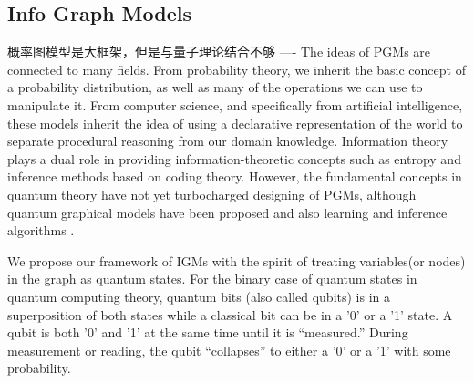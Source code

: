 \documentclass{article}
\theoremstyle{definition}
\theoremstyle{remark}
\theoremstyle{definition}
\begin{document}
\begin{CJK*}{UTF8}{gbsn}

\section{Info Graph Models}

概率图模型是大框架，但是与量子理论结合不够 ----
The ideas of PGMs are connected to many fields. From probability theory, we inherit the basic concept of a probability distribution, as well as many of the operations we can use to manipulate it. From computer science, and specifically from artificial intelligence, these models inherit the idea of using a declarative representation of the world to separate procedural reasoning from our domain knowledge. Information theory plays a dual role in providing information-theoretic concepts such as entropy and inference methods based on coding theory. However, the fundamental concepts in quantum theory have not yet turbocharged designing of PGMs, although quantum graphical models have been proposed and also learning and inference algorithms \cite{srinivasan2018learning, leifer2008quantum, jouneghani2013review}. 

We propose our framework of IGMs with the spirit of treating variables(or nodes) in the graph as quantum states. For the binary case of quantum states in quantum computing theory, quantum bits (also called qubits) is in a superposition of both states while a classical bit can be in a '0' or a '1' state. A qubit is both '0' and '1' at the same time until it is “measured.” During measurement or reading, the qubit “collapses” to either a '0' or a '1' with some probability.



\end{CJK*}
\end{document}
